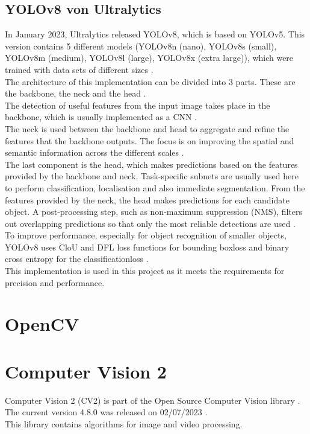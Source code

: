 	\subsection{YOLOv8 von Ultralytics}{ \label{subsec:YOLOv8_theoretic}
	
	In January 2023, Ultralytics released YOLOv8, which is based on YOLOv5. This version contains 5 different models (YOLOv8n (nano), YOLOv8s (small), YOLOv8m (medium), YOLOv8l (large), YOLOv8x (extra large)), which were trained with data sets of different sizes \citep{Terven2023}. \\	

	The architecture of this implementation can be divided into 3 parts. These are the backbone, the neck and the head \citep{Terven2023}. \\
	The detection of useful features from the input image takes place in the backbone, which is usually implemented as a CNN \citep{Terven2023}. \\
	The neck is used between the backbone and head to aggregate and refine the features that the backbone outputs. The focus is on improving the spatial and semantic information across the different scales \citep{Terven2023}. \\
	The last component is the head, which makes predictions based on the features provided by the backbone and neck. Task-specific subnets are usually used here to perform classification, localisation and also immediate segmentation. From the features provided by the neck, the head makes predictions for each candidate object. A post-processing step, such as non-maximum suppression (NMS), filters out overlapping predictions so that only the most reliable detections are used \citep{Terven2023}.\\
	To improve performance, especially for object recognition of smaller objects, YOLOv8 uses CloU \citep{Zheng2020} and DFL \citep{Li2020} loss functions for bounding boxloss and binary cross entropy for the classificationloss \citep{Terven2023}. \\

	This implementation is used in this project as it meets the requirements for precision and performance. 
	}

\section{OpenCV}

\section{Computer Vision 2}
		{ \label{subsec:Computer_Vision_2}
		Computer Vision 2 (CV2) is part of the \glqq Open Source Computer Vision\grqq{} library \citep{opencv_about}. The current version 4.8.0 was released on 02/07/2023 \citep{opencv_release}. \\
		This library contains algorithms for image and video processing. 
		}


